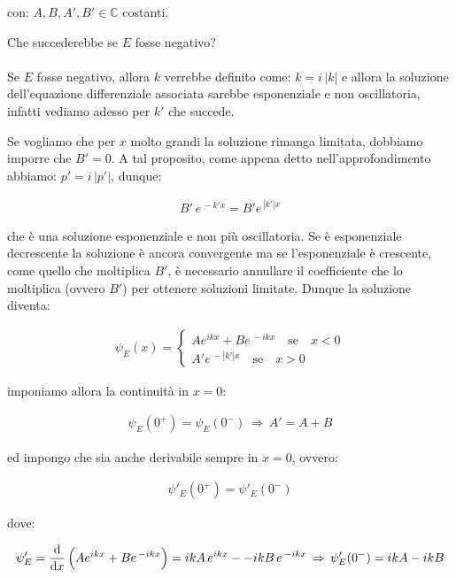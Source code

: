 \begin{enumerate}[label=\arabic*)]
		con: $A, B, A', B' \in \mathbb{C}$ costanti. 

\begin{myapprf}
	Che succederebbe se $E$ fosse negativo?
	\\
	\\
	Se $E$ fosse negativo, allora $k$ verrebbe definito come: $k = i \, |k|$ e allora la soluzione dell'equazione differenziale associata sarebbe esponenziale e non oscillatoria, infatti vediamo adesso per $k'$ che succede.
\end{myapprf}

		Se vogliamo che per $x$ molto grandi la soluzione rimanga limitata, dobbiamo imporre che $B' = 0$. A tal proposito, come appena detto nell'approfondimento abbiamo: $p' = i \, |p'|$, dunque:
		
\begin{align*}
	B' \, e^{ \, -k' x} = B' e^{\, |k'| x}
\end{align*}

	che è una soluzione esponenziale e non più oscillatoria. Se è esponenziale decrescente la soluzione è ancora convergente ma se l'esponenziale è crescente, come quello che moltiplica $B'$, è necessario annullare il coefficiente che lo moltiplica (ovvero $B'$) per ottenere soluzioni limitate. Dunque la soluzione diventa:
	
\begin{align*}
	\psi_E(x) = \begin{cases}
		Ae^{ikx} + Be^{\, -ikx} \quad \text{se} \quad x < 0 \\
		A'e^{ \, - |k'| x} \quad \text{se} \quad x > 0
	\end{cases}
\end{align*}
	
	imponiamo allora la continuità in $x = 0$:
	
\begin{align*}
	\psi_E(0^+) = \psi_E(0^-) \, \Rightarrow \, A' = A +B
\end{align*}

	ed impongo che sia anche derivabile sempre in $x = 0$, ovvero:
	
\begin{align*}
	\psi'_E(0^+) = \psi'_E(0^-) 
\end{align*}
	
	dove:
	
\begin{align*}
	\psi'_E = \dv{x} \, \qty\Big(Ae^{ikx} + Be^{\, -ikx}) = ikA \,e^{ikx} -  -ik B \, e^{\, -ikx} \, \Rightarrow \, \psi'_E(0^-) = ikA - ikB
\end{align*}
	

\end{enumerate}
